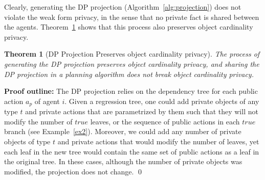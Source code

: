 \documentclass[letterpaper]{article}
\newcommand{\true}{\textit{true}}
\newtheorem{theorem}{Theorem}
\newcommand\cprivacy{object cardinality privacy}
\theoremstyle{definition}
\begin{document}
Clearly, generating the DP projection (Algorithm~\ref{alg:projection}) does not violate the weak form privacy, in the sense that no private fact is shared between the agents. Theorem~\ref{the:dp-proof} shows that this process also preserves \cprivacy .
\begin{theorem}[DP Projection Preserves \cprivacy ]
The process of generating the DP projection preserves \cprivacy,
and sharing the DP projection in a planning algorithm does not break \cprivacy .
\label{the:dp-proof}
\end{theorem}
{\bf Proof outline:}
The DP projection relies on the dependency tree for each public action $a_p$ of agent $i$. Given a regression tree, one could add private objects of any type $t$ and private actions that are parametrized by them such that they will not modify the number of $\true$ leaves, or the sequence of public actions in each $\true$ branch (see Example~\ref{ex2}).
Moreover, we could add any number of private objects of type $t$ and private actions that would modify the number of leaves, yet each leaf in the new tree would contain the same set of public actions as a leaf in the original tree. In these cases, although the number of private objects was modified, the projection  does not change. \qed
















\end{document}
